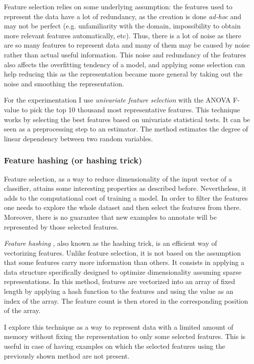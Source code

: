 Feature selection relies on some underlying assumption: the features used to
represent the data have a lot of redundancy, as the creation is done {\em
ad-hoc} and may not be perfect (e.g. unfamiliarity with the domain,
impossibility to obtain more relevant features automatically, etc). Thus, there
is a lot of noise as there are so many features to represent data and many of
them may be caused by noise rather than actual useful information. This noise
and redundancy of the features also affects the overfitting tendency of a
model, and applying some selection can help reducing this as the representation
became more general by taking out the noise and smoothing the representation.

For the experimentation I use {\em univariate feature selection} with the ANOVA
F-value \cite{Fisher:1921aa} to pick the top 10 thousand most representative
features. This technique works by selecting the best features based on
univariate statistical tests. It can be seen as a preprocessing step to an
estimator. The method estimates the degree of linear dependency between two
random variables.

\subsubsection{Feature hashing (or hashing
trick)}\label{sec:supervised:hashing}

Feature selection, as a way to reduce dimensionality of the input vector of a
classifier, attains some interesting properties as described before.
Nevertheless, it adds to the computational cost of training a model. In order
to filter the features one needs to explore the whole dataset and then select
the features from there. Moreover, there is no guarantee that new examples to
annotate will be represented by those selected features.

{\em Feature hashing} \cite{Weinberger:2009:FHL:1553374.1553516}, also known as
the hashing trick, is an efficient way of vectorizing features. Unlike feature
selection, it is not based on the assumption that some features carry more
information than others. It consists in applying a data structure specifically
designed to optimize dimensionality assuming sparse representations. In this
method, features are vectorized into an array of fixed length by applying a
hash function to the features and using the value as an index of the array. The
feature count is then stored in the corresponding position of the array.

I explore this technique as a way to represent data with a limited amount of
memory without fixing the representation to only some selected features. This
is useful in case of having examples on which the selected features using the
previously shown method are not present. 

